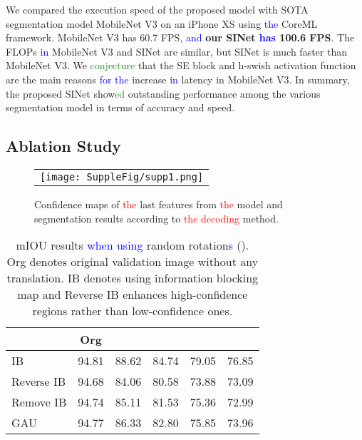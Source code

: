 \documentclass[10pt,twocolumn,letterpaper]{article}
\newcommand\Lars[1]{\textcolor{blue}{#1}}
\newcommand\yj[1]{\textcolor{ForestGreen}{#1}}
\newcommand\nj[1]{\textcolor{red}{#1}}
\newcommand\Lars[1]{#1}
\newcommand\yj[1]{#1}
\newcommand\nj[1]{#1}
\begin{document}
We compared the execution speed of the proposed model with SOTA segmentation model MobileNet V3 on an iPhone XS using \Lars{the} CoreML framework.
MobileNet V3 has 60.7 FPS, \Lars{and} \textbf{our SINet \Lars{has} 100.6 FPS}.
The FLOPs \Lars{in} MobileNet V3 and SINet are similar, but SINet is much faster than MobileNet V3.
We \yj{conjecture} that the SE block and h-swish activation function are the main reasons \Lars{for the} increase \Lars{in} latency in MobileNet V3.
In summary, the proposed SINet show\yj{ed} outstanding performance among the various segmentation model in terms of accuracy and speed.


\subsection{Ablation Study}
\label{sec:ablation}


\begin{figure}[t]
\begin{center}

\begin{tabular}{c}
    \texttt{[image: SuppleFig/supp1.png]}\\

        \end{tabular}\end{center}
\vspace{-2mm}
   \caption{Confidence maps of \nj{the} last features from \nj{the} model and segmentation results according to \nj{the decoding} method.}
\label{fig:ablation_IB}
\end{figure}

\begin{table}[t]
  \begin{center}
   \begin{tabular}{l | ccccc}
    \hline
          & Org    &     &    &     &  \\
          \hline \hline
    IB    & 94.81 & 88.62 & 84.74 & 79.05 & 76.85 \\
    Reverse IB & 94.68 & 84.06 & 80.58 & 73.88 & 73.09 \\
    Remove IB   & 94.74 & 85.11 & 81.53 & 75.36 & 72.99 \\
    GAU \cite{li2018pyramid}   & 94.77 & 86.33 & 82.80  & 75.85 & 73.96 \\

    \hline
    \end{tabular}

  \end{center}
   
  \caption{mIOU results \Lars{when using} random rotation\Lars{s} (). Org denotes original validation image without any translation. IB denotes using information blocking map and Reverse IB enhances high-confidence regions rather than low-confidence ones.}
\label{tab:IBablation}\end{table}
\end{document}
